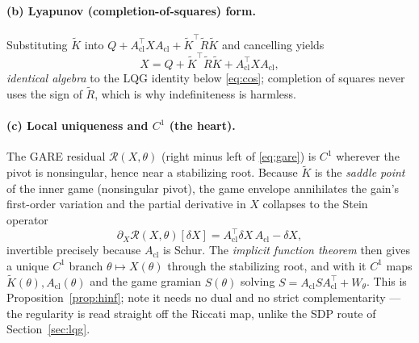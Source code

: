 \documentclass[11pt]{article}
\theoremstyle{definition}
\newcommand{\Acl}{A_{\mathrm{cl}}}
\newcommand{\Th}{\theta}
\begin{document}
\paragraph{(b) Lyapunov (completion-of-squares) form.}
Substituting $\tilde K$ into $Q+\Acl^\top X\Acl+\tilde K^\top\tilde R\tilde K$ and
cancelling yields
\begin{equation}\label{eq:garelyap}
X=Q+\tilde K^\top\tilde R\tilde K+\Acl^\top X\Acl,
\end{equation}
\emph{identical algebra} to the LQG identity below \eqref{eq:cos}; completion of
squares never uses the sign of $\tilde R$, which is why indefiniteness is harmless.

\paragraph{(c) Local uniqueness and $C^1$ (the heart).}
The GARE residual $\mathcal R(X,\Th)$ (right minus left of \eqref{eq:gare}) is
$C^1$ wherever the pivot is nonsingular, hence near a stabilizing root. Because
$\tilde K$ is the \emph{saddle point} of the inner game (nonsingular pivot), the
game envelope annihilates the gain's first-order variation and the partial
derivative in $X$ collapses to the Stein operator
\begin{equation}\label{eq:gareift}
\partial_X\mathcal R(X,\Th)[\delta X]=\Acl^\top\delta X\,\Acl-\delta X,
\end{equation}
invertible precisely because $\Acl$ is Schur. The \emph{implicit function theorem}
then gives a unique $C^1$ branch $\Th\mapsto X(\Th)$ through the stabilizing root,
and with it $C^1$ maps $\tilde K(\Th),\Acl(\Th)$ and the game gramian $S(\Th)$
solving $S=\Acl S\Acl^\top+W_\Th$. This is Proposition~\ref{prop:hinf}; note it
needs no dual and no strict complementarity --- the regularity is read straight off
the Riccati map, unlike the SDP route of Section~\ref{sec:lqg}.
\end{document}
